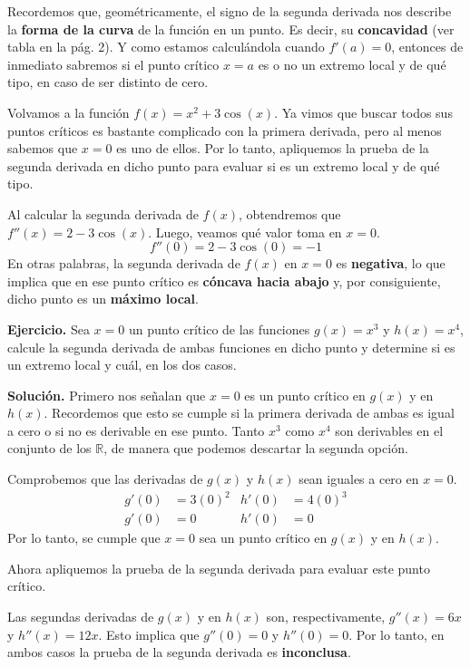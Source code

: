 \documentclass[12pt]{article}
\begin{document}
\newpage

Recordemos que, geométricamente, el signo de la segunda derivada nos describe la \textbf{forma de la curva} de la función en un punto. Es decir, su \textbf{concavidad} (ver tabla en la pág. 2). Y como estamos calculándola cuando $f'(a) = 0$, entonces de inmediato sabremos si el punto crítico $x = a$ es o no un extremo local y de qué tipo, en caso de ser distinto de cero.


Volvamos a la función $f(x) = x^{2} + 3\cos(x)$. Ya vimos que buscar todos sus puntos críticos es bastante complicado con la primera derivada, pero al menos sabemos que $x = 0$ es uno de ellos. Por lo tanto, apliquemos la prueba de la segunda derivada en dicho punto para evaluar si es un extremo local y de qué tipo.

Al calcular la segunda derivada de $f(x)$, obtendremos que $f''(x) = 2 - 3\cos(x)$. Luego, veamos qué valor toma en $x = 0$.
\[
	f''(0) = 2 - 3\cos(0) = -1
\]
En otras palabras, la segunda derivada de $f(x)$ en $x = 0$ es \textbf{negativa}, lo que implica que en ese punto crítico es \textbf{cóncava hacia abajo} y, por consiguiente, dicho punto es un \textbf{máximo local}.

\textbf{Ejercicio.} \quad Sea $x = 0$ un punto crítico de las funciones $g(x) = x^{3}$ y $h(x) = x^{4}$, calcule la segunda derivada de ambas funciones en dicho punto y determine si es un extremo local y cuál, en los dos casos.

\textbf{Solución.} \quad Primero nos señalan que $x = 0$ es un punto crítico en $g(x)$ y en $h(x)$. Recordemos que esto se cumple si la primera derivada de ambas es igual a cero o si no es derivable en ese punto. Tanto $x^{3}$ como $x^{4}$ son derivables en el conjunto de los $\mathbb{R}$, de manera que podemos descartar la segunda opción.

Comprobemos que las derivadas de $g(x)$ y $h(x)$ sean iguales a cero en $x = 0$.
\begin{align*}
g'(0) &= 3(0)^{2} & h'(0) &= 4(0)^{3} \\
g'(0) &= 0 & h'(0) &= 0
\end{align*}
Por lo tanto, se cumple que $x = 0$ sea un punto crítico en $g(x)$ y en $h(x)$.

Ahora apliquemos la prueba de la segunda derivada para evaluar este punto crítico.

Las segundas derivadas de $g(x)$ y en $h(x)$ son, respectivamente, $g''(x) = 6x$ y $h''(x) = 12x$. Esto implica que $g''(0) = 0$ y $h''(0) = 0$. Por lo tanto, en ambos casos la prueba de la segunda derivada es \textbf{inconclusa}.
\end{document}
